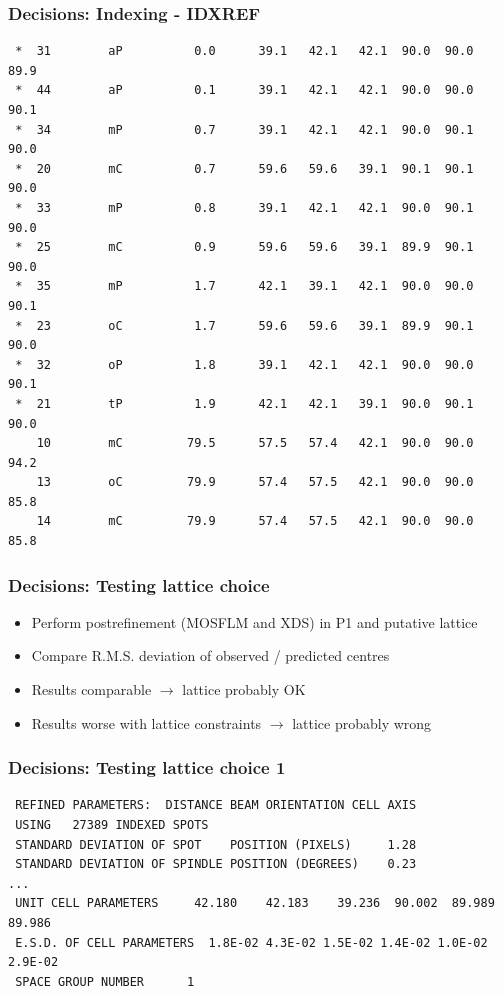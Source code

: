 \documentclass[slides,compress]{beamer}
\begin{document}
\begin{frame}[fragile]
\frametitle{Decisions: Indexing - IDXREF}
{\small
\begin{verbatim}
 *  31        aP          0.0      39.1   42.1   42.1  90.0  90.0  89.9
 *  44        aP          0.1      39.1   42.1   42.1  90.0  90.0  90.1
 *  34        mP          0.7      39.1   42.1   42.1  90.0  90.1  90.0
 *  20        mC          0.7      59.6   59.6   39.1  90.1  90.1  90.0
 *  33        mP          0.8      39.1   42.1   42.1  90.0  90.1  90.0
 *  25        mC          0.9      59.6   59.6   39.1  89.9  90.1  90.0
 *  35        mP          1.7      42.1   39.1   42.1  90.0  90.0  90.1
 *  23        oC          1.7      59.6   59.6   39.1  89.9  90.1  90.0
 *  32        oP          1.8      39.1   42.1   42.1  90.0  90.0  90.1
 *  21        tP          1.9      42.1   42.1   39.1  90.0  90.1  90.0
    10        mC         79.5      57.5   57.4   42.1  90.0  90.0  94.2
    13        oC         79.9      57.4   57.5   42.1  90.0  90.0  85.8
    14        mC         79.9      57.4   57.5   42.1  90.0  90.0  85.8
\end{verbatim}
}
\end{frame}

\begin{frame}
\frametitle{Decisions: Testing lattice choice}
\begin{itemize}
\item{Perform postrefinement (MOSFLM and XDS) in P1 and putative lattice}
\item{Compare R.M.S. deviation of observed / predicted centres}
\item{Results comparable $\rightarrow$ lattice probably OK}
\item{Results worse with lattice constraints $\rightarrow$ lattice probably
wrong}
\end{itemize}
\end{frame}

\begin{frame}[fragile]
\frametitle{Decisions: Testing lattice choice 1}
{\small
\begin{verbatim}
 REFINED PARAMETERS:  DISTANCE BEAM ORIENTATION CELL AXIS                   
 USING   27389 INDEXED SPOTS
 STANDARD DEVIATION OF SPOT    POSITION (PIXELS)     1.28
 STANDARD DEVIATION OF SPINDLE POSITION (DEGREES)    0.23
...
 UNIT CELL PARAMETERS     42.180    42.183    39.236  90.002  89.989  89.986
 E.S.D. OF CELL PARAMETERS  1.8E-02 4.3E-02 1.5E-02 1.4E-02 1.0E-02 2.9E-02
 SPACE GROUP NUMBER      1
\end{verbatim}
}
\end{frame}
\end{document}
